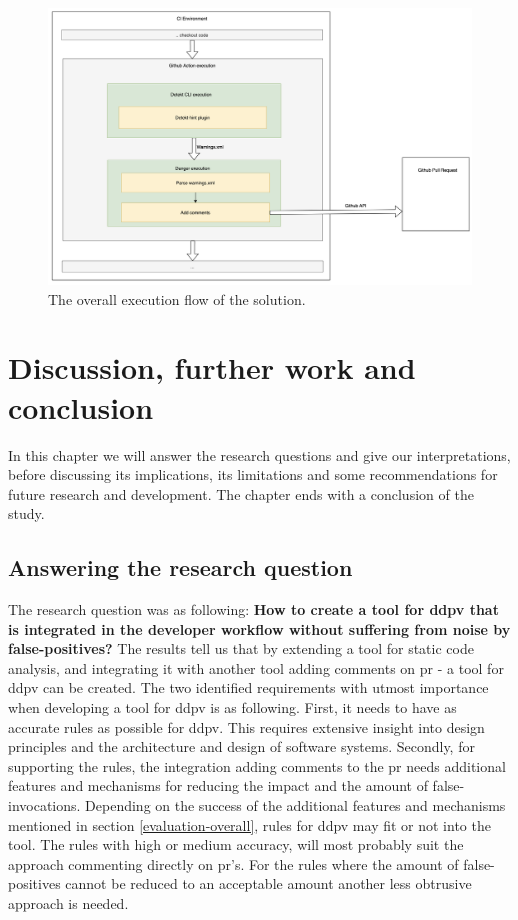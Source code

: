\documentclass{report}
\begin{document}
\begin{figure}
    \centering
    \includegraphics[width=\textwidth]{images/detekt-hint-execution.png}
    \caption{The overall execution flow of the solution.}
    \label{fig:integration}
\end{figure}


\chapter{Discussion, further work and conclusion}
\label{discussion}
In this chapter we will answer the research questions and give our interpretations, before discussing its implications, its limitations and some recommendations for future research and development. The chapter ends with a conclusion of the study.

\section{Answering the research question}

The research question was as following: \textbf{How to create a tool for \gls{ddpv} that is integrated in the developer workflow without suffering from noise by false-positives?}
The results tell us that by extending a tool for static code analysis, and integrating it with another tool adding comments on \gls{pr} - a tool for \gls{ddpv} can be created. The two identified requirements with utmost importance when developing a tool for \gls{ddpv} is as following. First, it needs to have as accurate rules as possible for \gls{ddpv}. This requires extensive insight into design principles and the architecture and design of software systems. Secondly, for supporting the rules, the integration adding comments to the \gls{pr} needs additional features and mechanisms for reducing the impact and the amount of false-invocations. Depending on the success of the additional features and mechanisms mentioned in section \ref{evaluation-overall}, rules for \gls{ddpv} may fit or not into the tool. The rules with high or medium accuracy, will most probably suit the approach commenting directly on \gls{pr}'s. For the rules where the amount of false-positives cannot be reduced to an acceptable amount another less obtrusive approach is needed. 
\end{document}
